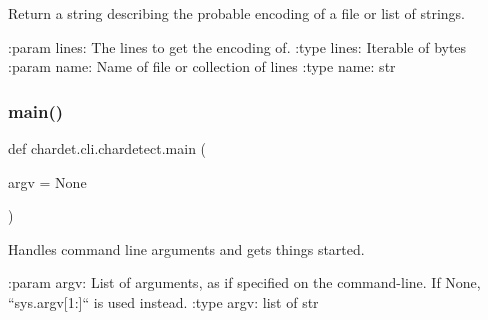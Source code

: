 \begin{DoxyVerb}Return a string describing the probable encoding of a file or
list of strings.

:param lines: The lines to get the encoding of.
:type lines: Iterable of bytes
:param name: Name of file or collection of lines
:type name: str
\end{DoxyVerb}
 \mbox{\label{namespacechardet_1_1cli_1_1chardetect_af41492a0775361976aa3864cb94f1679}} 
\subsubsection{\texorpdfstring{main()}{main()}}
{\footnotesize\ttfamily def chardet.\+cli.\+chardetect.\+main (\begin{DoxyParamCaption}\item[{}]{argv = {\ttfamily None} }\end{DoxyParamCaption})}

\begin{DoxyVerb}Handles command line arguments and gets things started.

:param argv: List of arguments, as if specified on the command-line.
             If None, ``sys.argv[1:]`` is used instead.
:type argv: list of str
\end{DoxyVerb}
 